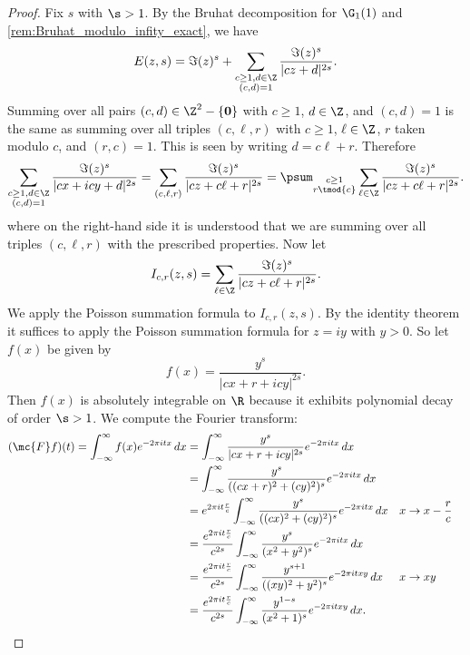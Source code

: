       \begin{proof}
        Fix $s$ with $\s > 1$. By the Bruhat decomposition for $\G_{1}(1)$ and \cref{rem:Bruhat_modulo_infity_exact}, we have
        \[
          E(z,s) = \Im(z)^{s}+\sum_{\substack{c \ge 1, d \in \Z \\ (c,d) = 1}}\frac{\Im(z)^{s}}{|cz+d|^{2s}}.
        \]
        Summing over all pairs $(c,d) \in \Z^{2}-\{\mathbf{0}\}$ with $c \ge 1$, $d \in \Z$, and $(c,d) = 1$ is the same as summing over all triples $(c,\ell,r)$ with $c \ge 1$, $\ell \in \Z$, $r$ taken modulo $c$, and $(r,c) = 1$. This is seen by writing $d = c\ell+r$. Therefore
        \[
          \sum_{\substack{c \ge 1, d \in \Z \\ (c,d) = 1}}\frac{\Im(z)^{s}}{|cx+icy+d|^{2s}} = \sum_{(c,\ell,r)}\frac{\Im(z)^{s}}{|cz+c\ell+r|^{2s}} = \psum_{\substack{c \ge 1 \\ r \tmod{c}}}\sum_{\ell \in \Z}\frac{\Im(z)^{s}}{|cz+c\ell+r|^{2s}}.
        \]
         where on the right-hand side it is understood that we are summing over all triples $(c,\ell,r)$ with the prescribed properties. Now let
        \[
          I_{c,r}(z,s) = \sum_{\ell \in \Z}\frac{\Im(z)^{s}}{|cz+c\ell+r|^{2s}}.
        \]
        We apply the Poisson summation formula to $I_{c,r}(z,s)$. By the identity theorem it suffices to apply the Poisson summation formula for $z = iy$ with $y > 0$. So let $f(x)$ be given by
        \[
          f(x) = \frac{y^{s}}{|cx+r+icy|^{2s}}.
        \]
        Then $f(x)$ is absolutely integrable on $\R$ because it exhibits polynomial decay of order $\s > 1$. We compute the Fourier transform:
        \begin{align*}
          (\mc{F}f)(t) = \int_{-\infty}^{\infty}f(x)e^{-2\pi itx}\,dx &= \int_{-\infty}^{\infty}\frac{y^{s}}{|cx+r+icy|^{2s}}e^{-2\pi itx}\,dx \\
          &= \int_{-\infty}^{\infty}\frac{y^{s}}{((cx+r)^{2}+(cy)^{2})^{s}}e^{-2\pi itx}\,dx \\
          &= e^{2\pi it\frac{r}{c}}\int_{-\infty}^{\infty}\frac{y^{s}}{((cx)^{2}+(cy)^{2})^{s}}e^{-2\pi itx}\,dx && \text{$x \to x-\frac{r}{c}$} \\
          &= \frac{e^{2\pi it\frac{r}{c}}}{c^{2s}}\int_{-\infty}^{\infty}\frac{y^{s}}{(x^{2}+y^{2})^{s}}e^{-2\pi itx}\,dx \\
          &= \frac{e^{2\pi it\frac{r}{c}}}{c^{2s}}\int_{-\infty}^{\infty}\frac{y^{s+1}}{((xy)^{2}+y^{2})^{s}}e^{-2\pi itxy}\,dx && \text{$x \to xy$} \\
          &= \frac{e^{2\pi it\frac{r}{c}}}{c^{2s}}\int_{-\infty}^{\infty}\frac{y^{1-s}}{(x^{2}+1)^{s}}e^{-2\pi itxy}\,dx.

\end{align*}
\end{proof}

